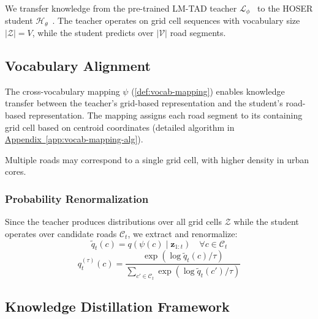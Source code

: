 We transfer knowledge from the pre-trained LM-TAD teacher $\mathcal{L}_\phi$~\cite{mbuyaTrajectoryAnomalyDetection2024} to the HOSER student $\mathcal{H}_\theta$~\cite{caoHolisticSemanticRepresentation2025}. The teacher operates on grid cell sequences with vocabulary size $|\mathcal{Z}| = V$, while the student predicts over $|\mathcal{V}|$ road segments.



\subsection{Vocabulary Alignment}
\label{sec:method-vocab}

The cross-vocabulary mapping $\psi$ (\autoref{def:vocab-mapping}) enables knowledge transfer between the teacher's grid-based representation and the student's road-based representation. The mapping assigns each road segment to its containing grid cell based on centroid coordinates (detailed algorithm in \hyperref[app:vocab-mapping-alg]{Appendix~\ref*{app:vocab-mapping-alg}}).

\begin{remark}
    Multiple roads may correspond to a single grid cell, with higher density in urban cores.
\end{remark}

\subsubsection{Probability Renormalization}
\label{sec:method-renorm}

Since the teacher produces distributions over all grid cells $\mathcal{Z}$ while the student operates over candidate roads $\mathcal{C}_t$, we extract and renormalize:
\begin{equation}
    \tilde{q}_t(c) = q(\psi(c) \mid \mathbf{z}_{1:t}) \quad \forall c \in \mathcal{C}_t
    \label{eq:extract}
\end{equation}
\begin{equation}
    q_t^{(\tau)}(c) = \frac{\exp(\log \tilde{q}_t(c) / \tau)}{\sum_{c' \in \mathcal{C}_t} \exp(\log \tilde{q}_t(c') / \tau)}
    \label{eq:renorm}
\end{equation}

\subsection{Knowledge Distillation Framework}
\label{sec:method-kl}

